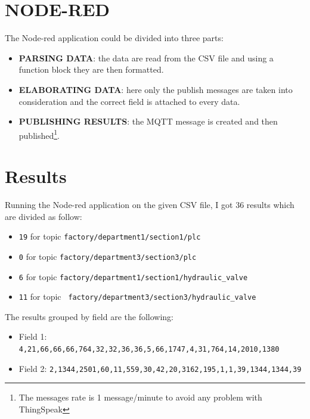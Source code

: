 \documentclass{article}
\begin{document}
	    \section{NODE-RED} %
		The Node-red application could be divided into three parts:
			\begin{itemize}
			\item \textbf{PARSING DATA}: the data are read from the CSV file and using a function block they are then formatted.
			\item \textbf{ELABORATING DATA}: here only the publish messages are taken into consideration and the correct field is attached to every data.
			\item \textbf{PUBLISHING RESULTS}: the MQTT message is created and then published\footnote{The messages rate is 1 message/minute to avoid any problem with ThingSpeak}.
            \end{itemize}
		
		\section{Results} %
		Running the Node-red application on the given CSV file, I got 36 results which are divided as follow:
		
		\begin{itemize}
		    \item \texttt{19} for topic \texttt{factory/department1/section1/plc}
		    \item \texttt{0} for topic \texttt{factory/department3/section3/plc}
		    \item \texttt{6} for topic \texttt{factory/department1/section1/hydraulic\_valve}
		    \item \texttt{11} for topic \texttt{ factory/department3/section3/hydraulic\_valve}

		\end{itemize}
		The results grouped by field are the following: 
		\begin{itemize}
		    \item Field 1: \texttt{4,21,66,66,66,764,32,32,36,36,5,66,1747,4,31,764,14,2010,1380}
		    \item Field 2: \texttt{2,1344,2501,60,11,559,30,42,20,3162,195,1,1,39,1344,1344,39}
		\end{itemize}
		
		\pagebreak
		\clearpage
\end{document}
